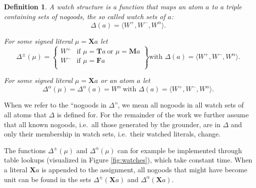 \documentclass[final]{vutinfth} %
\newtheorem{definition}{Definition}[chapter]
\newcommand{\bT}{\mathbf{T}}
\newcommand{\bM}{\mathbf{M}}
\newcommand{\bF}{\mathbf{F}}
\newcommand{\bX}{\mathbf{X}}
\newcommand{\dpm}{\Delta^\pm}
\newcommand{\dal}{\Delta^\alpha}
\newcommand{\sgl}{\mu}
\begin{document}
\begin{definition}
A \emph{watch structure} is a function that maps an atom $a$ to a triple containing sets of nogoods, the so called \emph{watch sets} of $a$: $$\Delta(a) = \langle W^+, W^-, W^\alpha \rangle .$$


For some signed literal $\sgl = \bX a$ let $$\dpm(\sgl) = \left\{\begin{array}{ll}
        W^+ & \text{if } \sgl = \bT a \ \text{or } \sgl = \bM a\\
        W^- & \text{if } \sgl = \bF a \\
        \end{array}\right\} \text{with } \Delta(a) = \langle W^+, W^-, W^\alpha \rangle .$$

For some signed literal $\sgl = \bX a$ or an atom $a$ let $$\dal(\sgl) = \dal(a) = W^\alpha \ \text{with } \Delta(a) = \langle W^+, W^-, W^\alpha \rangle .$$
\end{definition}

When we refer to the \enquote{nogoods in $\Delta$}, we mean all nogoods in all watch sets of all atoms that $\Delta$ is defined for. For the remainder of the work we further assume that all known nogoods, i.e.~all those generated by the grounder, are in $\Delta$ and only their membership in watch sets, i.e.~their watched literals, change.

The functions $\dpm(\sgl)$ and $\dal(\sgl)$ can for example be implemented through table lookups (visualized in Figure \ref{fig:watches}), which take constant time. When a literal $\bX a$ is appended to the assignment, all nogoods that might have become unit can be found in the sets $\dpm(\bX a)$ and $\dal(\bX a)$.

\end{document}
